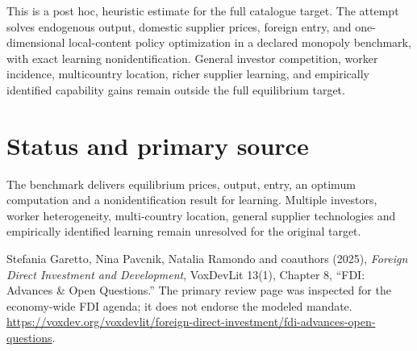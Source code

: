 \documentclass[11pt]{article}
\begin{document}
This is a post hoc, heuristic estimate for the full catalogue target.
The attempt solves endogenous output, domestic supplier prices, foreign entry, and one-dimensional local-content policy optimization in a declared monopoly benchmark, with exact learning nonidentification. General investor competition, worker incidence, multicountry location, richer supplier learning, and empirically identified capability gains remain outside the full equilibrium target.

\section*{Status and primary source}
The benchmark delivers equilibrium prices, output, entry, an optimum computation and a nonidentification result for learning. Multiple investors, worker heterogeneity, multi-country location, general supplier technologies and empirically identified learning remain unresolved for the original target.

Stefania Garetto, Nina Pavcnik, Natalia Ramondo and coauthors (2025), \emph{Foreign Direct Investment and Development}, VoxDevLit 13(1), Chapter 8, ``FDI: Advances \& Open Questions.'' The primary review page was inspected for the economy-wide FDI agenda; it does not endorse the modeled mandate. \url{https://voxdev.org/voxdevlit/foreign-direct-investment/fdi-advances-open-questions}.
\end{document}
